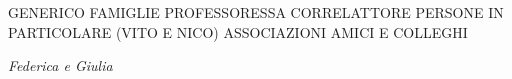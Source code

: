 GENERICO
FAMIGLIE
PROFESSORESSA
CORRELATTORE
PERSONE IN PARTICOLARE (VITO E NICO)
ASSOCIAZIONI
AMICI E COLLEGHI

\begin{flushright}
\textit{Federica e Giulia}
\end{flushright}
